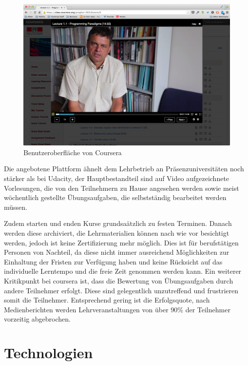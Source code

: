 			\begin{figure}[h]
				\begin{center}
					\includegraphics[width=\textwidth]{img/coursera}
					\caption{Benutzeroberfläche von Coursera}
					\label{fig:screenshot-coursera}
				\end{center}
			\end{figure}


			Die angebotene Plattform ähnelt dem Lehrbetrieb an Präsenzuniversitäten noch stärker als bei Udacity, der Hauptbestandteil sind  auf Video aufgezeichnete Vorlesungen, die von den Teilnehmern zu Hause angesehen werden sowie meist wöchentlich gestellte Übungsaufgaben, die selbstständig bearbeitet werden müssen.

			Zudem starten und enden Kurse grundsaätzlich zu festen Terminen.
			Danach werden diese archiviert, die Lehrmaterialien können nach wie vor besichtigt werden, jedoch ist keine Zertifizierung mehr möglich.
			Dies ist für berufstätigen Personen von Nachteil, da diese nicht immer ausreichend Möglichkeiten zur Einhaltung der Fristen zur Verfügung haben und keine Rücksicht auf das individuelle Lerntempo und die freie Zeit genommen werden kann.
			Ein weiterer Kritikpunkt bei coursera ist, dass die Bewertung von Übungsaufgaben durch andere Teilnehmer erfolgt.
			Diese sind gelegentlich unzutreffend und frustrieren somit die Teilnehmer.
			Entsprechend gering ist die Erfolgsquote, nach Medienberichten werden Lehrveranstaltungen von über 90\% der Teilnehmer vorzeitig abgebrochen. 


\section{Technologien}
\label{sec:technologies}

